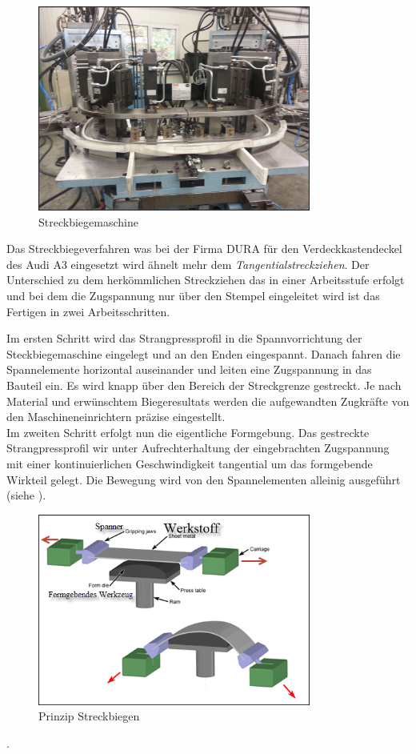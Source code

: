 \documentclass[12pt,a4paper,parskip]{scrartcl}
\begin{document}
\begin{figure}[hbtp]
\centering
\includegraphics[width=0.8\textwidth]{Streckbiegemaschine}
\caption{Streckbiegemaschine}
\label{fig:Streckbiegemaschine}
\end{figure}
Das Streckbiegeverfahren was bei der Firma DURA  für den Verdeckkastendeckel des Audi A3 eingesetzt wird ähnelt mehr dem \emph{Tangentialstreckziehen}. Der Unterschied zu dem herkömmlichen Streckziehen das in einer Arbeitsstufe erfolgt und bei dem die Zugspannung nur über den Stempel eingeleitet wird ist das Fertigen in zwei Arbeitsschritten.

 Im ersten Schritt wird das Strangpressprofil in die Spannvorrichtung der Steckbiegemaschine eingelegt und an den Enden eingespannt. Danach fahren die Spannelemente horizontal auseinander und leiten eine Zugspannung in das Bauteil ein. Es wird knapp über den Bereich der Streckgrenze gestreckt. Je nach Material und erwünschtem Biegeresultats werden die aufgewandten Zugkräfte von den Maschineneinrichtern präzise eingestellt.\\
  Im zweiten Schritt erfolgt nun die eigentliche Formgebung. Das gestreckte Strangpressprofil wir unter Aufrechterhaltung der eingebrachten Zugspannung mit einer kontinuierlichen Geschwindigkeit tangential um das formgebende Wirkteil gelegt. Die Bewegung wird von den Spannelementen alleinig ausgeführt (siehe ).
  \begin{figure}[hbtp]
  \centering
  \includegraphics[width=0.8\textwidth]{streckbiegen}
  \caption[Prinzip Streckbiegen]{Prinzip Streckbiegen\protect\footnotemark}
  \label{fig:streckbiegen} 
  \end{figure}
  . 
  
\end{document}
